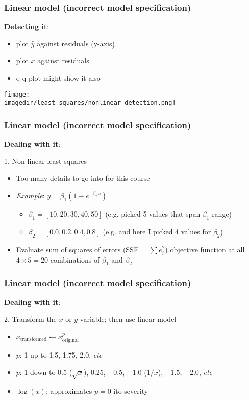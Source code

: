 \begin{frame}\frametitle{Linear model (incorrect model specification)}

	\textbf{Detecting it}:
	\begin{itemize}
		\item	plot $\hat{y}$ against residuals (y-axis)
		\item	plot $x$ against residuals
		\item	q-q plot might show it also
	\end{itemize}
	\begin{center}
		\texttt{[image: \\imagedir/least-squares/nonlinear-detection.png]}
	\end{center}
\end{frame}

\begin{frame}\frametitle{Linear model (incorrect model specification)}

	\textbf{Dealing with it}:

	1. Non-linear least squares
	\begin{itemize}
		\item	Too many details to go into for this course
		\item	\emph{Example}: $y = \beta_1\left(1-e^{-\beta_2 x} \right)$
		\begin{itemize}
			\item	$\beta_1 = [10, 20, 30, 40, 50]$ {\scriptsize (e.g. picked 5 values that span $\beta_1$ range)}
			\item	$\beta_2 = [0.0, 0.2, 0.4, 0.8]$ {\scriptsize (e.g. and here I picked 4 values for $\beta_2$)}
		\end{itemize}
		\item	Evaluate sum of squares of errors (SSE = $\displaystyle \sum{e_i^2}$) objective function at all $4 \times 5 = 20$ combinations of $\beta_1$ and $\beta_2$
	\end{itemize}
\end{frame}

\begin{frame}\frametitle{Linear model (incorrect model specification)}

	\textbf{Dealing with it}:

	2. Transform the $x$ or $y$ variable; then use linear model
	\begin{itemize}
		\item	$x_\text{transformed} \leftarrow x^p_\text{original}$
		\item	$p$: 1 up to 1.5, 1.75, 2.0, \emph{etc}
		\item	$p$: 1 down to 0.5 ($\sqrt{x}$), 0.25, $-0.5$, $-1.0$ ($1/x$), $-1.5$, $-2.0$, \emph{etc}
		\item	$\log(x)$: approximates $p=0$ ito severity
	\end{itemize}
\end{frame}

